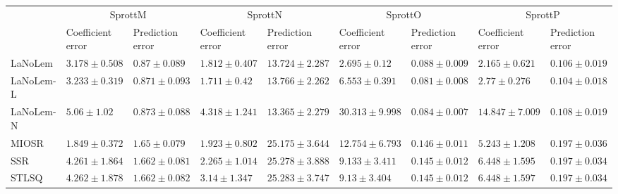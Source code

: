 \begin{table*}
{\begin{tabular}{lllllllll}
 & \multicolumn{2}{c}{SprottM} & \multicolumn{2}{c}{SprottN} & \multicolumn{2}{c}{SprottO} & \multicolumn{2}{c}{SprottP} \\
 & Coefficient error & Prediction error & Coefficient error & Prediction error & Coefficient error & Prediction error & Coefficient error & Prediction error \\
\midrule
LaNoLem & $3.178\pm 0.508$ & $\mathbf{0.87}\pm 0.089$ & $1.812\pm 0.407$ & $13.724\pm 2.287$ & $\mathbf{2.695}\pm 0.12$ & $0.088\pm 0.009$ & $\mathbf{2.165}\pm 0.621$ & $0.106\pm 0.019$ \\
LaNoLem-L & $3.233\pm 0.319$ & $0.871\pm 0.093$ & $\mathbf{1.711}\pm 0.42$ & $13.766\pm 2.262$ & $6.553\pm 0.391$ & $\mathbf{0.081}\pm 0.008$ & $2.77\pm 0.276$ & $\mathbf{0.104}\pm 0.018$ \\
LaNoLem-N & $5.06\pm 1.02$ & $0.873\pm 0.088$ & $4.318\pm 1.241$ & $\mathbf{13.365}\pm 2.279$ & $30.313\pm 9.998$ & $0.084\pm 0.007$ & $14.847\pm 7.009$ & $0.108\pm 0.019$ \\
MIOSR & $\mathbf{1.849}\pm 0.372$ & $1.65\pm 0.079$ & $1.923\pm 0.802$ & $25.175\pm 3.644$ & $12.754\pm 6.793$ & $0.146\pm 0.011$ & $5.243\pm 1.208$ & $0.197\pm 0.036$ \\
SSR & $4.261\pm 1.864$ & $1.662\pm 0.081$ & $2.265\pm 1.014$ & $25.278\pm 3.888$ & $9.133\pm 3.411$ & $0.145\pm 0.012$ & $6.448\pm 1.595$ & $0.197\pm 0.034$ \\
STLSQ & $4.262\pm 1.878$ & $1.662\pm 0.082$ & $3.14\pm 1.347$ & $25.283\pm 3.747$ & $9.13\pm 3.404$ & $0.145\pm 0.012$ & $6.448\pm 1.597$ & $0.197\pm 0.034$ \\

\midrule


\end{tabular}}
\end{table*}
